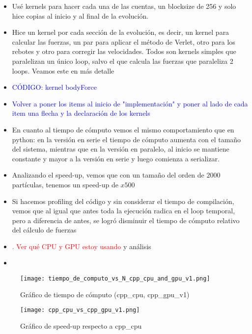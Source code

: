 \documentclass[aps,prb,twocolumn,superscriptaddress,floatfix,longbibliography]{revtex4-2}
\newcounter{para}
\begin{document}
\begin{itemize}
\begin{itemize}
    \item Usé kernels para hacer cada una de las cuentas, un blocksize de 256 y solo hice copias al inicio y al final de la evolución.
    \item Hice un kernel por cada sección de la evolución, es decir, un kernel para calcular las fuerzas, un par para aplicar el método de Verlet, otro para los rebotes y otro para corregir las velocidades. Todos son kernels simples que paralelizan un único loop, salvo el que calcula las fuerzas que paraleliza 2 loops. Veamos este en más detalle
    \item \textcolor{blue}{CÓDIGO: kernel bodyForce}
    \item \textcolor{blue}{Volver a poner los items al inicio de "implementación" y poner al lado de cada item una flecha y la declaración de los kernels}
    \item En cuanto al tiempo de cómputo vemos el mismo comportamiento que en python: en la versión en serie el tiempo de cómputo aumenta con el tamaño del sistema, mientras que en la versión en paralelo, al inicio se mantiene constante y mayor a la versión en serie y luego comienza a serializar.
    \item Analizando el speed-up, vemos que con un tamaño del orden de $2000$ partículas, tenemos un speed-up de $x500$
    \item Si hacemos profiling del código y sin considerar el tiempo de compilación, vemos que al igual que antes toda la ejecución radica en el loop temporal, pero a diferencia de antes, se logró disminuir el tiempo de cómputo relativo del cálculo de fuerzas
    \item \textcolor{red}{. Ver qué CPU y GPU estoy usando} y análisis
    \item 
\end{itemize}

\begin{figure}[h]
    \texttt{[image: tiempo\_de\_computo\_vs\_N\_cpp\_cpu\_and\_gpu\_v1.png]}
    \caption{Gráfico de tiempo de cómputo (cpp_cpu, cpp_gpu_v1)}
     \label{fig:tiempo_de_computo_vs_N_cpp_cpu_and_gpu_v1}
\end{figure}


\begin{figure}[h]
    \texttt{[image: cpp\_cpu\_vs\_cpp\_gpu\_v1.png]}
    \caption{Gráfico de speed-up respecto a cpp_cpu}
     \label{fig:cpp_cpu_vs_cpp_gpu_v1}
\end{figure}



\end{itemize}
\end{document}
